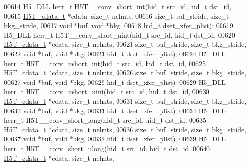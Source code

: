 \begin{DoxyCode}
00614 H5\_DLL herr\_t H5T\_\_conv\_short\_int(hid\_t src\_id, hid\_t dst\_id,
00615                   \hyperlink{struct_h5_t__cdata__t}{H5T\_cdata\_t} *cdata, \textcolor{keywordtype}{size\_t} nelmts,
00616                   \textcolor{keywordtype}{size\_t} buf\_stride, \textcolor{keywordtype}{size\_t} bkg\_stride,
00617                                   \textcolor{keywordtype}{void} *buf, \textcolor{keywordtype}{void} *bkg,
00618                                   hid\_t dset\_xfer\_plist);
00619 H5\_DLL herr\_t H5T\_\_conv\_short\_uint(hid\_t src\_id, hid\_t dst\_id,
00620                    \hyperlink{struct_h5_t__cdata__t}{H5T\_cdata\_t} *cdata, \textcolor{keywordtype}{size\_t} nelmts,
00621                    \textcolor{keywordtype}{size\_t} buf\_stride, \textcolor{keywordtype}{size\_t} bkg\_stride,
00622                                    \textcolor{keywordtype}{void} *buf, \textcolor{keywordtype}{void} *bkg,
00623                                    hid\_t dset\_xfer\_plist);
00624 H5\_DLL herr\_t H5T\_\_conv\_ushort\_int(hid\_t src\_id, hid\_t dst\_id,
00625                    \hyperlink{struct_h5_t__cdata__t}{H5T\_cdata\_t} *cdata, \textcolor{keywordtype}{size\_t} nelmts,
00626                    \textcolor{keywordtype}{size\_t} buf\_stride, \textcolor{keywordtype}{size\_t} bkg\_stride,
00627                                    \textcolor{keywordtype}{void} *buf, \textcolor{keywordtype}{void} *bkg,
00628                                    hid\_t dset\_xfer\_plist);
00629 H5\_DLL herr\_t H5T\_\_conv\_ushort\_uint(hid\_t src\_id, hid\_t dst\_id,
00630                     \hyperlink{struct_h5_t__cdata__t}{H5T\_cdata\_t} *cdata, \textcolor{keywordtype}{size\_t} nelmts,
00631                     \textcolor{keywordtype}{size\_t} buf\_stride, \textcolor{keywordtype}{size\_t} bkg\_stride,
00632                                     \textcolor{keywordtype}{void} *buf, \textcolor{keywordtype}{void} *bkg,
00633                                     hid\_t dset\_xfer\_plist);
00634 H5\_DLL herr\_t H5T\_\_conv\_short\_long(hid\_t src\_id, hid\_t dst\_id,
00635                    \hyperlink{struct_h5_t__cdata__t}{H5T\_cdata\_t} *cdata, \textcolor{keywordtype}{size\_t} nelmts,
00636                    \textcolor{keywordtype}{size\_t} buf\_stride, \textcolor{keywordtype}{size\_t} bkg\_stride,
00637                                    \textcolor{keywordtype}{void} *buf, \textcolor{keywordtype}{void} *bkg,
00638                                    hid\_t dset\_xfer\_plist);
00639 H5\_DLL herr\_t H5T\_\_conv\_short\_ulong(hid\_t src\_id, hid\_t dst\_id,
00640                     \hyperlink{struct_h5_t__cdata__t}{H5T\_cdata\_t} *cdata, \textcolor{keywordtype}{size\_t} nelmts,

\end{DoxyCode}
